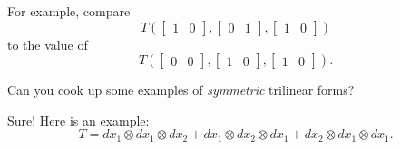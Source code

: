 \documentclass{ximera}
\begin{document}
\begin{question}
  For example, compare
  $$
  T\left( \begin{bmatrix} 1 & 0 \end{bmatrix}, \begin{bmatrix} 0 & 1 \end{bmatrix}, \begin{bmatrix} 1 & 0 \end{bmatrix} \right)
  $$
  to the value of 
  $$
  T\left( \begin{bmatrix} 0 & 0 \end{bmatrix}, \begin{bmatrix} 1 & 0 \end{bmatrix}, \begin{bmatrix} 1 & 0 \end{bmatrix} \right).
  $$

  Can you cook up some examples of \textit{symmetric} trilinear forms?
  \begin{free-response}
    Sure!   Here is an example:
    $$
    T = dx_1 \otimes dx_1 \otimes dx_2 + dx_1 \otimes dx_2 \otimes dx_1 + dx_2 \otimes dx_1 \otimes dx_1.
    $$
  \end{free-response}

\end{question}
\end{document}
